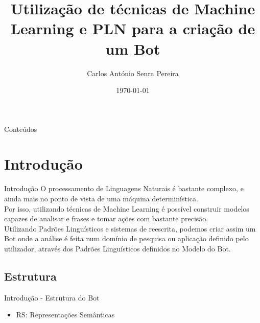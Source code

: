 \documentclass{beamer}
\title[Short Paper Title] %
{Utilização de técnicas de Machine Learning e PLN para a criação de um Bot}
\author[Carlos] %
{Carlos António Senra Pereira\inst{1} } %
\institute[Universidade do Minho] %
{
  \inst{1}%
  Mestrado em Matemática e Computação\\
  Departamento de Matemática\\
  Universidade do Minho
}
\date[Short Occasion] %
{\today}
\begin{document}
\begin{frame}
  \titlepage
\end{frame}

\begin{frame}{Conteúdos}
  \tableofcontents
\end{frame}


\section{Introdução}
\begin{frame}{Introdução}
\hspace{11pt} O processamento de Linguagens Naturais é bastante complexo, e ainda mais no ponto de vista de uma máquina determinística.\\
\vspace{2mm}
Por isso, utilizando técnicas de Machine Learning é possível construir modelos capazes de analisar e frases e tomar ações com bastante precisão. \\
\vspace{2mm}
\hspace{11pt}Utilizando Padrões Linguísticos e sistemas de reescrita, podemos criar assim um Bot onde a análise é feita num domínio de pesquisa ou aplicação definido pelo utilizador, através dos Padrões Linguísticos definidos no Modelo do Bot.

\end{frame}

\subsection{Estrutura}
\begin{frame}{Introdução - Estrutura do Bot}

\begin{center}
\end{center}

\begin{itemize}
\item RS: Representações Semânticas
\end{itemize}

\end{frame}
\end{document}

